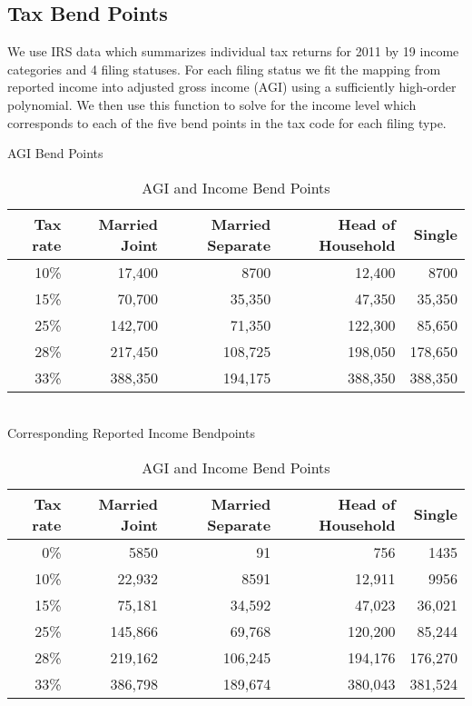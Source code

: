 \documentclass[letterpaper,12pt]{article}
\theoremstyle{definition}
\numberwithin{equation}{section}
\begin{document}
\begin{spacing}{1.5}
  \subsection{Tax Bend Points}
      We use IRS data which summarizes individual tax returns for 2011 by 19 income categories and 4 filing statuses.  For each filing status we fit the mapping from reported income into adjusted gross income (AGI) using a sufficiently high-order polynomial.  We then use this function to solve for the income level which corresponds to each of the five bend points in the tax code for each filing type.
      \begin{table}[ht]
        \caption{AGI and Income Bend Points}
        \label{Calib_Bend_Tab1}
        \centering
        AGI Bend Points
        \begin{tabular}{|r|r|r|r|r|} \hline 
          Tax rate & Married Joint & Married Separate & Head of Household & Single \\ \hline 
          10\% & 17,400 & 8700 & 12,400 & 8700 \\ \hline 
          15\% & 70,700 & 35,350 & 47,350 & 35,350 \\ \hline 
          25\% & 142,700 & 71,350 & 122,300 & 85,650 \\ \hline 
          28\% & 217,450 & 108,725 & 198,050 & 178,650 \\ \hline 
          33\% & 388,350 & 194,175 & 388,350 & 388,350 \\ \hline 
        \end{tabular}
        \\
        Corresponding Reported Income Bendpoints
        \begin{tabular}{|r|r|r|r|r|} \hline 
          Tax rate & Married Joint & Married Separate & Head of Household & Single \\ \hline 
          0\%  & 5850  & 91 & 756 & 1435 \\ \hline 
          10\% & 22,932 & 8591 & 12,911 & 9956 \\ \hline 
          15\% & 75,181 & 34,592 & 47,023 & 36,021 \\ \hline 
          25\% & 145,866 & 69,768 & 120,200 & 85,244 \\ \hline 
          28\% & 219,162 & 106,245 & 194,176 & 176,270 \\ \hline 
          33\% & 386,798 & 189,674 & 380,043 & 381,524 \\ \hline 
        \end{tabular}
      \end{table}


\end{spacing}
\end{document}
